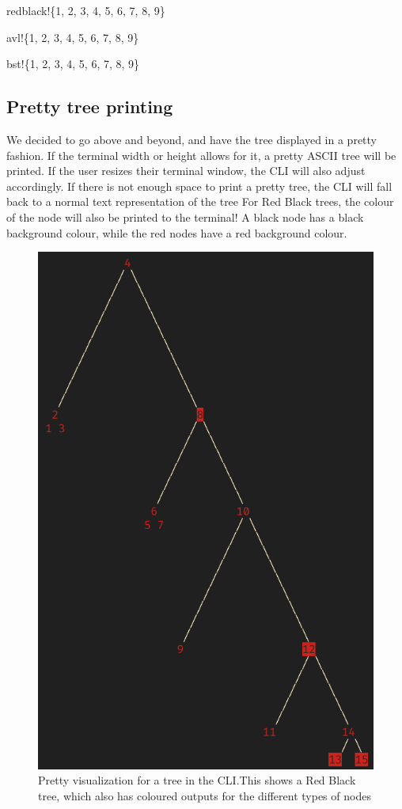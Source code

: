 \documentclass[letterpaper]{article}
\begin{document}
\begin{texttt}
	redblack!\{1, 2, 3, 4, 5, 6, 7, 8, 9\}
\end{texttt}

\begin{texttt}
	avl!\{1, 2, 3, 4, 5, 6, 7, 8, 9\}
\end{texttt}

\begin{texttt}
	bst!\{1, 2, 3, 4, 5, 6, 7, 8, 9\}
\end{texttt}

\subsection{Pretty tree printing}
We decided to go above and beyond, and have the tree displayed in a pretty
fashion. If the terminal width or height allows for it, a pretty ASCII tree will
be printed. If the user resizes their terminal window, the CLI will also adjust
accordingly.  If there is not enough space to print a pretty tree, the CLI will
fall back to a normal text representation of the tree For Red Black trees, the
colour of the node will also be printed to the terminal! A black node has a
black background colour, while the red nodes have a red background colour.
\begin{figure}[H]
	\centering
	\includegraphics[width=.8\textwidth]{rbtree.png}
	\caption{Pretty visualization for a tree in the CLI.\@ This shows a Red
		Black tree, which also has coloured outputs for the different types of
		nodes}
\end{figure}
\end{document}
